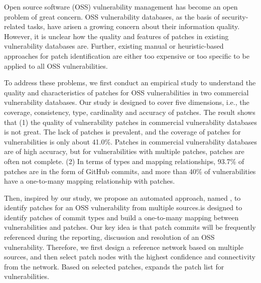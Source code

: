 \begin{abstract*}
Open source software (OSS) vulnerability management has become an open problem of great concern.%
OSS vulnerability databases, as the basis of security-related tasks, have arisen a growing concern about their information quality. However, it is unclear how the quality and features of patches in existing vulnerability databases are. Further, existing manual or heuristic-based approaches for patch identification are either too expensive or too specific to be applied to all OSS vulnerabilities.

To address these problems, we first conduct an empirical study to understand the quality and characteristics of patches for OSS vulnerabilities in two commercial vulnerability databases. Our study is designed to cover five dimensions, i.e., the coverage, consistency, type, cardinality and accuracy of patches. The result shows that (1) the quality of vulnerability patches in commercial vulnerability databases is not great. The lack of patches is prevalent, and the coverage of patches for vulnerabilities is only about 41.0\%. Patches in commercial vulnerability databases are of high accuracy, but for vulnerabilities with multiple patches, patches are often not complete. (2) In terms of types and mapping relationships, 93.7\% of patches are in the form of GitHub commits, and more than 40\% of vulnerabilities have a one-to-many mapping relationship with patches.

Then, inspired by our study, we propose an automated approach, named \tool, to identify patches for an OSS vulnerability from multiple sources.\tool is designed to identify patches of commit types and build a one-to-many mapping between vulnerabilities and patches. Our key idea is that patch commits will be frequently referenced during the reporting, discussion and resolution of an OSS vulnerability. Therefore, we first design a reference network based on multiple sources, and then select patch nodes with the highest confidence and connectivity from the network. Based on selected patches, \tool expands the patch list for vulnerabilities.


\end{abstract*}
